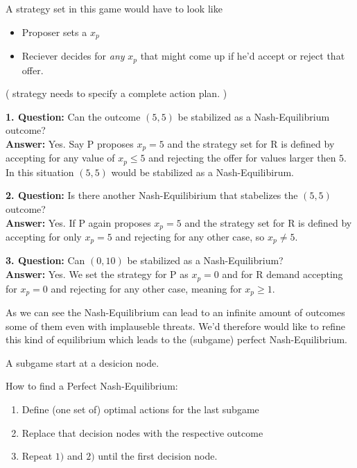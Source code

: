 \begin{example}
	A strategy set in this game would have to look like
	\begin{itemize}
		\item Proposer sets a $x_{p}$
		\item Reciever decides for \textit{any} $x_{p}$ that might come up if he'd accept or reject that offer.
	\end{itemize}
	( strategy needs to specify a complete action plan. )
	
	
	\textbf{1. Question:} Can the outcome $(5, 5)$ be stabilized as a Nash-Equilibrium outcome? \\
	\textbf{Answer:} Yes. Say P proposes $x_{p} = 5$ and the strategy set for R is defined by accepting for any value of $x_{p} \leq 5$ and rejecting the offer for values larger then $5$. \\
		In this situation $(5, 5)$ would be stabilized as a Nash-Equilibirum.


	\textbf{2. Question:} Is there another Nash-Equilibirium that stabelizes the $(5, 5)$ outcome? \\
	\textbf{Answer:} Yes. If P again proposes $x_{p} = 5$ and the strategy set for R is defined by accepting for only $x_{p} = 5$ and rejecting for any other case, so $x_{p} \neq 5$. 
	
	
	\textbf{3. Question:} Can $(0, 10)$ be stabilized as a Nash-Equilibrium? \\
	\textbf{Answer:} Yes. We set the strategy for P as $x_{p} = 0$ and for R demand accepting for $x_{p} = 0$ and rejecting for any other case, meaning for $x_{p} \geq 1$. 
\end{example}

As we can see the Nash-Equilibrium can lead to an infinite amount of outcomes some of them even with implauseble threats. We'd therefore would like to refine this kind of equilibrium which leads to the (subgame) perfect Nash-Equilibrium.

\begin{definition}[Subgame]
	A subgame start at a desicion node. 
\end{definition}

\begin{definition}
	How to find a Perfect Nash-Equilibrium:
	\begin{enumerate}
		\item Define (one set of) optimal actions for the last subgame
		\item Replace that decision nodes with the respective outcome
		\item Repeat $1)$ and $2)$ until the first decision node.
	\end{enumerate}
\end{definition}

